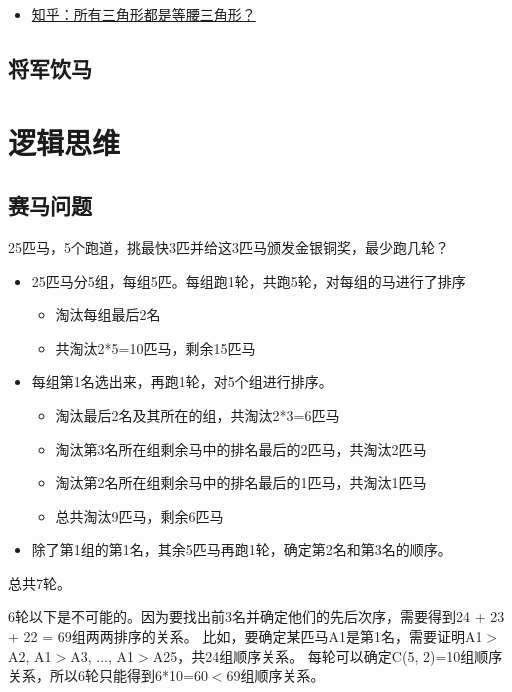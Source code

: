 \documentclass[export, 12pt, letterpaper]{ctexrep}
\begin{document}
\begin{itemize}
\item{ \href{https://www.zhihu.com/question/34781603/answer/59948789}{知乎：所有三角形都是等腰三角形？} }
\end{itemize}



\section{将军饮马}




\chapter{逻辑思维}


\section{赛马问题}
25匹马，5个跑道，挑最快3匹并给这3匹马颁发金银铜奖，最少跑几轮？


\begin{itemize}
\item{ 25匹马分5组，每组5匹。每组跑1轮，共跑5轮，对每组的马进行了排序
\begin{itemize}
\item{ 淘汰每组最后2名 }
\item{ 共淘汰2*5=10匹马，剩余15匹马 }
\end{itemize}
 }
\item{ 每组第1名选出来，再跑1轮，对5个组进行排序。
\begin{itemize}
\item{ 淘汰最后2名及其所在的组，共淘汰2*3=6匹马 }
\item{ 淘汰第3名所在组剩余马中的排名最后的2匹马，共淘汰2匹马 }
\item{ 淘汰第2名所在组剩余马中的排名最后的1匹马，共淘汰1匹马 }
\item{ 总共淘汰9匹马，剩余6匹马 }
\end{itemize}
 }
\item{ 除了第1组的第1名，其余5匹马再跑1轮，确定第2名和第3名的顺序。 }
\end{itemize}


总共7轮。

6轮以下是不可能的。因为要找出前3名并确定他们的先后次序，需要得到24 + 23 + 22 = 69组两两排序的关系。
比如，要确定某匹马A1是第1名，需要证明A1$>$A2, A1$>$A3, ..., A1$>$A25，共24组顺序关系。
每轮可以确定C(5, 2)=10组顺序关系，所以6轮只能得到6*10=60$<$69组顺序关系。
\end{document}
